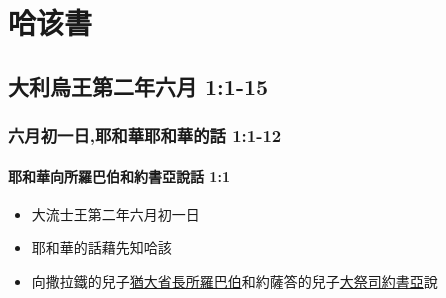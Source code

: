 








\chapter{哈该書}
\section{大利烏王第二年六月 1:1-15}

\subsection{六月初一日,耶和華耶和華的話 1:1-12}
\subsubsection{耶和華向所羅巴伯和約書亞說話 1:1}
\begin{itemize} 
\itemsep-.35em 
\item 大流士王第二年六月初一日
\item 耶和華的話藉先知哈該
\item 向撒拉鐵的兒子\underline{猶大省長所羅巴伯}和約薩答的兒子\underline{大祭司約書亞}說
\end{itemize}

